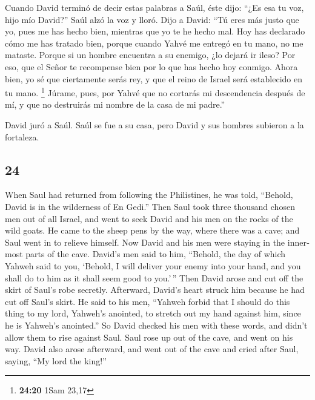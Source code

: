 \begin{paracol}{2}
 Cuando David terminó de decir estas palabras a Saúl,
éste dijo: ``¿Es esa tu voz, hijo mío David?'' Saúl alzó la voz y lloró.
 Dijo a David: ``Tú eres más justo que yo, pues me has
hecho bien, mientras que yo te he hecho mal.  Hoy has
declarado cómo me has tratado bien, porque cuando Yahvé me entregó en tu
mano, no me mataste.  Porque si un hombre encuentra a su
enemigo, ¿lo dejará ir ileso? Por eso, que el Señor te recompense bien
por lo que has hecho hoy conmigo.  Ahora bien, yo sé que
ciertamente serás rey, y que el reino de Israel será establecido en tu
mano. \footnote{\textbf{24:20} 1Sam 23,17}  Júrame, pues,
por Yahvé que no cortarás mi descendencia después de mí, y que no
destruirás mi nombre de la casa de mi padre.''

 David juró a Saúl. Saúl se fue a su casa, pero David y
sus hombres subieron a la fortaleza.

\switchcolumn
\begin{otherlanguage}{english}

\hypertarget{section-47}{%
\section{24}\label{section-47}}

 When Saul had returned from following the Philistines, he
was told, ``Behold, David is in the wilderness of En Gedi.''
 Then Saul took three thousand chosen men out of all
Israel, and went to seek David and his men on the rocks of the wild
goats.  He came to the sheep pens by the way, where there
was a cave; and Saul went in to relieve himself. Now David and his men
were staying in the innermost parts of the cave.  David's
men said to him, ``Behold, the day of which Yahweh said to you, `Behold,
I will deliver your enemy into your hand, and you shall do to him as it
shall seem good to you.'\,'' Then David arose and cut off the skirt of
Saul's robe secretly.  Afterward, David's heart struck him
because he had cut off Saul's skirt.  He said to his men,
``Yahweh forbid that I should do this thing to my lord, Yahweh's
anointed, to stretch out my hand against him, since he is Yahweh's
anointed.''  So David checked his men with these words,
and didn't allow them to rise against Saul. Saul rose up out of the
cave, and went on his way.  David also arose afterward,
and went out of the cave and cried after Saul, saying, ``My lord the
king!''


\end{otherlanguage}
\end{paracol}
